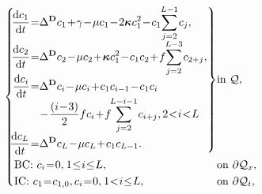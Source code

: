                 \begin{equation}
                    \hspace{-.16cm plus .1cm minus .1cm}
                    \SpazMate{1}{1}{1}
                    \left\{\begin{alignedat}{2}
                        &\hspace{-.2cm plus .1cm minus .1cm}
                        \left.\begin{aligned}
                            \derT{c_1}t=&\DeltaD c_1
                            +\gamma-\mu c_1-2\boldsymbol\kappa c_1^2-
                            c_1\!\!\sum_{j=2}^{L-1}c_j,\\[\vspcESMO]
                            \derT{c_2}t=&\DeltaD c_2
                            -\mu c_2+\boldsymbol\kappa c_1^2-c_1c_2+
                            f\!\!\sum_{j=2}^{L-3}c_{2+j},\\[\vspcESMO]
                            \derT{c_i}t=&\DeltaD c_i
                            -\mu c_i+c_1c_{i-1}-c_1c_i\\[\vspcRSMO]&
                            -\frac{(i-3)}2fc_i+
                            f\!\!\!\sum_{j=2}^{L-i-1}c_{i+j},
                            \;\;2<i<L\\[\vspcESMO]
                            \derT{c_L}t=&\DeltaD c_L-\mu c_L+c_1c_{L-1}.
                        \end{aligned}\right\}
                        &&\text{in }\STCyl,\\
                        &\text{BC: }c_i=0,\;\;\; 1\le i\le L,
                        &&\text{on }\partial\STCyl_x,\\
                        &\text{IC: }c_1=c_{1,0},\;\; c_i=0,\;\;\;1<i\le L,
                        &&\text{on }\partial\STCyl_t,
                    \end{alignedat}\right.
                    \label{eqSMOContinuousDinmensionless}
                \end{equation}

